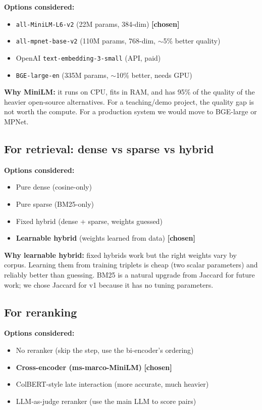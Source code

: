 \documentclass[11pt,a4paper]{article}
\begin{document}
\begin{alt}
\textbf{Options considered:}
\begin{itemize}[leftmargin=*, itemsep=0pt, topsep=0pt]
\item \texttt{all-MiniLM-L6-v2} (22M params, 384-dim)  \textbf{[chosen]}
\item \texttt{all-mpnet-base-v2} (110M params, 768-dim, $\sim$5\% better quality)
\item OpenAI \texttt{text-embedding-3-small} (API, paid)
\item \texttt{BGE-large-en} (335M params, $\sim$10\% better, needs GPU)
\end{itemize}
\end{alt}

\textbf{Why MiniLM:} it runs on CPU, fits in RAM, and has 95\% of the quality of the heavier open-source alternatives. For a teaching/demo project, the quality gap is not worth the compute. For a production system we would move to BGE-large or MPNet.

\subsection{For retrieval: dense vs sparse vs hybrid}

\begin{alt}
\textbf{Options considered:}
\begin{itemize}[leftmargin=*, itemsep=0pt, topsep=0pt]
\item Pure dense (cosine-only)
\item Pure sparse (BM25-only)
\item Fixed hybrid (dense + sparse, weights guessed)
\item \textbf{Learnable hybrid} (weights learned from data) \textbf{[chosen]}
\end{itemize}
\end{alt}

\textbf{Why learnable hybrid:} fixed hybrids work but the right weights vary by corpus. Learning them from training triplets is cheap (two scalar parameters) and reliably better than guessing. BM25 is a natural upgrade from Jaccard for future work; we chose Jaccard for v1 because it has no tuning parameters.

\subsection{For reranking}

\begin{alt}
\textbf{Options considered:}
\begin{itemize}[leftmargin=*, itemsep=0pt, topsep=0pt]
\item No reranker (skip the step, use the bi-encoder's ordering)
\item \textbf{Cross-encoder (ms-marco-MiniLM)} \textbf{[chosen]}
\item ColBERT-style late interaction (more accurate, much heavier)
\item LLM-as-judge reranker (use the main LLM to score pairs)
\end{itemize}
\end{alt}
\end{document}

